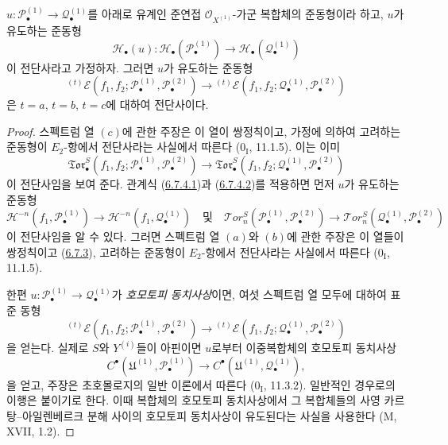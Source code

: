 \begin{proposition}[6.7.5]
\label{III.6.7.5-fr}
$u:\mathscr P_\bullet^{(1)}\to\mathscr Q_\bullet^{(1)}$를 아래로 유계인
준연접 $\mathscr O_{X^{(1)}}$-가군 복합체의 준동형이라 하고, $u$가
유도하는 준동형
\[
  \mathscr H_\bullet(u):
  \mathscr H_\bullet(\mathscr P_\bullet^{(1)})
  \longrightarrow
  \mathscr H_\bullet(\mathscr Q_\bullet^{(1)})
\]
이 전단사라고 가정하자. 그러면 $u$가 유도하는 준동형
\[
  {}^{(t)}\mathscr E
  (f_1,f_2;\mathscr P_\bullet^{(1)},\mathscr P_\bullet^{(2)})
  \longrightarrow
  {}^{(t)}\mathscr E
  (f_1,f_2;\mathscr Q_\bullet^{(1)},\mathscr P_\bullet^{(2)})
\]
은 $t=a$, $t=b$, $t=c$에 대하여 전단사이다.
\end{proposition}

\begin{proof}
스펙트럼 열 $(c)$에 관한 주장은 이 열이 쌍정칙이고, 가정에 의하여
고려하는 준동형이 $E_2$-항에서 전단사라는 사실에서 따른다
($0_{\mathrm I}$, 11.1.5). 이는 이미
\[
  \mathfrak{Tor}_\bullet^S
  (f_1,f_2;\mathscr P_\bullet^{(1)},\mathscr P_\bullet^{(2)})
  \longrightarrow
  \mathfrak{Tor}_\bullet^S
  (f_1,f_2;\mathscr Q_\bullet^{(1)},\mathscr P_\bullet^{(2)})
\]
이 전단사임을 보여 준다. 관계식
(\hyperref[III.6.7.4.1.fr]{6.7.4.1})과
(\hyperref[III.6.7.4.2.fr]{6.7.4.2})를 적용하면 먼저 $u$가 유도하는
준동형
\[
  \mathscr H^{-n}(f_1,\mathscr P_\bullet^{(1)})
  \longrightarrow
  \mathscr H^{-n}(f_1,\mathscr Q_\bullet^{(1)})
  \quad\text{및}\quad
  \mathscr{T}\!or_n^S
  (\mathscr P_\bullet^{(1)},\mathscr P_\bullet^{(2)})
  \longrightarrow
  \mathscr{T}\!or_n^S
  (\mathscr Q_\bullet^{(1)},\mathscr P_\bullet^{(2)})
\]
이 전단사임을 알 수 있다. 그러면 스펙트럼 열 $(a)$와 $(b)$에 관한
주장은 이 열들이 쌍정칙이고
(\hyperref[III.6.7.3-fr]{6.7.3}), 고려하는 준동형이 $E_2$-항에서
전단사라는 사실에서 따른다 ($0_{\mathrm I}$, 11.1.5).

한편
$u:\mathscr P_\bullet^{(1)}\to\mathscr Q_\bullet^{(1)}$가
\emph{호모토피 동치사상}이면, 여섯 스펙트럼 열 모두에 대하여 표준
동형
\[
  {}^{(t)}\mathscr E
  (f_1,f_2;\mathscr P_\bullet^{(1)},\mathscr P_\bullet^{(2)})
  \longrightarrow
  {}^{(t)}\mathscr E
  (f_1,f_2;\mathscr Q_\bullet^{(1)},\mathscr P_\bullet^{(2)})
\]
을 얻는다. 실제로 $S$와 $Y^{(i)}$들이 아핀이면 $u$로부터
이중복합체의 호모토피 동치사상
\[
  C^\bullet(\mathfrak U^{(1)},\mathscr P_\bullet^{(1)})
  \longrightarrow
  C^\bullet(\mathfrak U^{(1)},\mathscr Q_\bullet^{(1)}),
\]
을 얻고, 주장은 초호몰로지의 일반 이론에서 따른다
($0_{\mathrm I}$, 11.3.2). 일반적인 경우로의 이행은 붙이기로 한다.
이때 복합체의 호모토피 동치사상에서 그 복합체들의 사영
카르탕--아일렌베르크 분해 사이의 호모토피 동치사상이 유도된다는
사실을 사용한다 (M, XVII, 1.2).
\end{proof}

